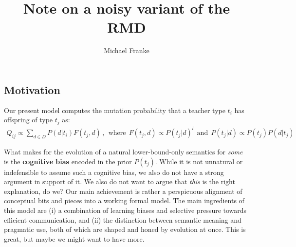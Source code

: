 \documentclass[fleqn,reqno,10pt]{article}
\title{Note on a noisy variant of the RMD}
\author{Michael Franke}
\date{}
\begin{document}
\maketitle

\subsection*{Motivation}

Our present model computes the mutation probability that a teacher type $t_i$ has
offspring of type $t_j$ as:
\begin{align*}
  Q_{ij}  \propto \sum_{d \in D} P(d|t_i) F(t_j,d) \,, \ \  \text{where} \ \
F(t_j,d)  \propto P(t_j|d)^l \ \  \text{and} \ \ P(t_j|d) \propto P(t_j) P(d|t_j)
\end{align*}

\noindent What makes for the evolution of a natural lower-bound-only semantics for \emph{some}
is the \textbf{cognitive bias} encoded in the prior $P({t_j})$. While it is not unnatural or
indefensible to assume such a cognitive bias, we also do not have a strong argument in support
of it. We also do not want to argue that \emph{this} is the right explanation, do we? Our main
achievement is rather a perspicuous alignment of conceptual bits and pieces into a working
formal model. The main ingredients of this model are (i) a combination of learning biases and
selective pressure towards efficient communication, and (ii) the distinction between semantic
meaning and pragmatic use, both of which are shaped and honed by evolution at once. This is
great, but maybe we might want to have more.
\end{document}
